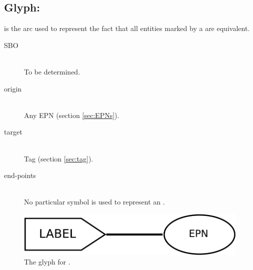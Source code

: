 \subsection{Glyph:  }\label{sec:equivalenceArc}

 is the arc used to represent the fact that all entities
marked by a  are equivalent. 

\begin{description}
 \item[SBO]\mbox{}\\ To be determined.
 \item[origin]\mbox{}\\ Any EPN (section \ref{sec:EPNs}).
 \item[target]\mbox{}\\ Tag (section \ref{sec:tag}).
 \item[end-points]\mbox{}\\ No particular symbol is used to represent an .
 \end{description}

\begin{figure}[H]
  \centering
  \includegraphics[scale = 0.5]{images/equivalence}
  \caption{The \PD glyph for .}
  \label{fig:equivalence}
\end{figure}
